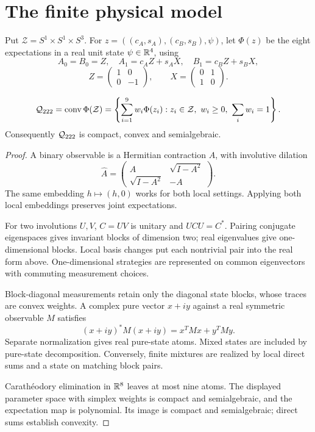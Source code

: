 \section{The finite physical model}

Put \(\mathcal Z=S^1\times S^1\times S^3\).
For \(z=((c_A,s_A),(c_B,s_B),\psi)\), let \(\Phi(z)\) be the eight
expectations in a real unit state \(\psi\in\mathbb R^4\), using
\[
 A_0=B_0=Z,\quad A_1=c_AZ+s_AX,\quad B_1=c_BZ+s_BX,
\]
\[
 Z=\begin{pmatrix}1&0\\0&-1\end{pmatrix},\qquad
 X=\begin{pmatrix}0&1\\1&0\end{pmatrix}.
\]

\begin{proposition}
\[
 \mathcal Q_{222}=\operatorname{conv}\Phi(\mathcal Z)
 =\left\{\sum_{i=1}^{9}w_i\Phi(z_i):
 z_i\in\mathcal Z,\ w_i\ge0,\ \sum_iw_i=1\right\}.
\]
Consequently \(\mathcal Q_{222}\) is compact, convex and semialgebraic.
\end{proposition}

\begin{proof}
A binary observable is a Hermitian contraction \(A\), with involutive
dilation
\[
 \widehat A=
 \begin{pmatrix}A&\sqrt{I-A^2}\\
 \sqrt{I-A^2}&-A\end{pmatrix}.
\]
The same embedding \(h\mapsto(h,0)\) works for both local settings.
Applying both local embeddings preserves joint expectations.

For two involutions \(U,V\), \(C=UV\) is unitary and \(UCU=C^*\).
Pairing conjugate eigenspaces gives invariant blocks of dimension two;
real eigenvalues give one-dimensional blocks. Local basis changes put
each nontrivial pair into the real form above. One-dimensional
strategies are represented on common eigenvectors with commuting
measurement choices.

Block-diagonal measurements retain only the diagonal state blocks,
whose traces are convex weights. A complex pure vector \(x+iy\)
against a real symmetric observable \(M\) satisfies
\[
 (x+iy)^*M(x+iy)=x^TMx+y^TMy.
\]
Separate normalization gives real pure-state atoms. Mixed states are
included by pure-state decomposition. Conversely, finite mixtures are
realized by local direct sums and a state on matching block pairs.

Carath\'eodory elimination in \(\mathbb R^8\) leaves at most nine atoms.
The displayed parameter space with simplex weights is compact and
semialgebraic, and the expectation map is polynomial. Its image is
compact and semialgebraic; direct sums establish convexity.
\end{proof}

